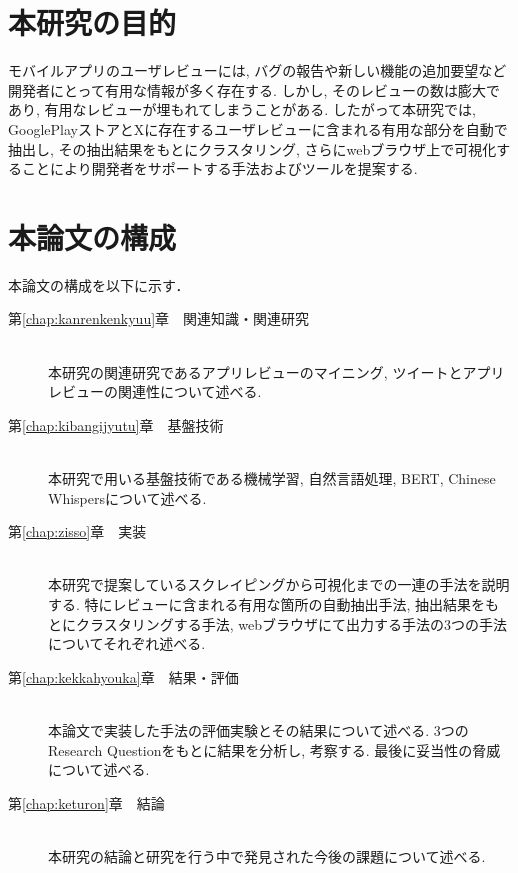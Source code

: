 
\section{本研究の目的}

モバイルアプリのユーザレビューには, バグの報告や新しい機能の追加要望など開発者にとって有用な情報が多く存在する. しかし, そのレビューの数は膨大であり, 有用なレビューが埋もれてしまうことがある. 
したがって本研究では, GooglePlayストアとXに存在するユーザレビューに含まれる有用な部分を自動で抽出し, その抽出結果をもとにクラスタリング, さらにwebブラウザ上で可視化することにより開発者をサポートする手法およびツールを提案する. 


\section{本論文の構成}
本論文の構成を以下に示す．
\begin{description}

\item[第\ref{chap:kanrenkenkyuu}章　関連知識・関連研究]\mbox{}\\
本研究の関連研究であるアプリレビューのマイニング, ツイートとアプリレビューの関連性について述べる. \\

\item[第\ref{chap:kibangijyutu}章　基盤技術]\mbox{}\\
本研究で用いる基盤技術である機械学習, 自然言語処理, BERT, Chinese Whispersについて述べる. \\

\item[第\ref{chap:zisso}章　実装]\mbox{}\\
本研究で提案しているスクレイピングから可視化までの一連の手法を説明する. 特にレビューに含まれる有用な箇所の自動抽出手法, 抽出結果をもとにクラスタリングする手法, webブラウザにて出力する手法の3つの手法についてそれぞれ述べる. \\

\item[第\ref{chap:kekkahyouka}章　結果・評価]\mbox{}\\
本論文で実装した手法の評価実験とその結果について述べる. 3つのResearch Questionをもとに結果を分析し, 考察する. 最後に妥当性の脅威について述べる. \\

\item[第\ref{chap:keturon}章　結論]\mbox{}\\
本研究の結論と研究を行う中で発見された今後の課題について述べる. \\

\end{description}